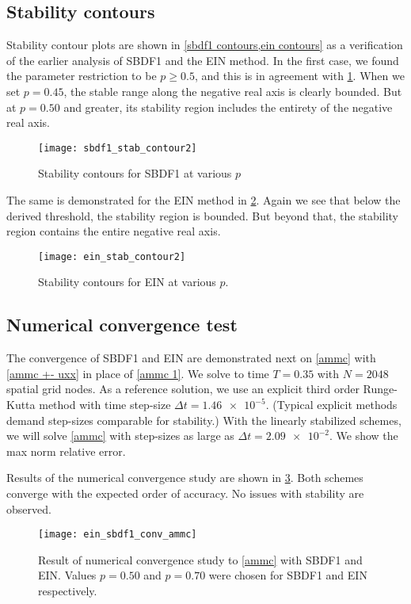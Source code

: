 \subsection{Stability contours}
Stability contour plots are shown in \cref{sbdf1 contours,ein contours} as a verification of the earlier analysis of SBDF1 and the EIN method. In the first case, we found the parameter restriction to be $p\geq 0.5$, and this is in agreement with \cref{sbdf1 contours}. When we set $p=0.45$, the stable range along the negative real axis is clearly bounded. But at $p=0.50$ and greater, its stability region includes the entirety of the negative real axis.
\begin{figure}[htb!]
        \centering
\texttt{[image: sbdf1\_stab\_contour2]}
\caption{Stability contours for SBDF1 at various $p$}
\label{sbdf1 contours}
\end{figure}

The same is demonstrated for the EIN method in \cref{ein contours}. Again we see that below the derived threshold, the stability region is bounded. But beyond that, the stability region contains the entire negative real axis.
\begin{figure}[htb!]
        \centering
\texttt{[image: ein\_stab\_contour2]}
\caption[Stability contours for EIN at various $p$]{Stability contours for EIN at various $p$.}
\label{ein contours}
\end{figure}

\subsection{Numerical convergence test}
\label{ein conv test}
The convergence of SBDF1 and EIN are demonstrated next on \cref{ammc} with \cref{ammc +- uxx} in place of \eqref{ammc 1}. We solve to time $T=0.35$ with $N=2048$ spatial grid nodes. As a reference solution, we use an explicit third order Runge-Kutta method with time step-size $\Delta t=\num{1.46e-5}$. (Typical explicit methods demand step-sizes comparable for stability.) With the linearly stabilized schemes, we will solve \cref{ammc} with step-sizes as large as $\Delta t = \num{2.09e-2}$. We show the max norm relative error.

Results of the numerical convergence study are shown in \cref{ein_sbdf1_conv_ammc}. Both schemes converge with the expected order of accuracy. No issues with stability are observed.
\begin{figure}[htb!]
        \centering
\texttt{[image: ein\_sbdf1\_conv\_ammc]}
\caption[Numerical convergence study with SBDF1 and EIN]{Result of numerical convergence study to \cref{ammc} with SBDF1 and EIN. Values $p=0.50$ and $p=0.70$ were chosen for SBDF1 and EIN respectively.}
\label{ein_sbdf1_conv_ammc}
\end{figure}
